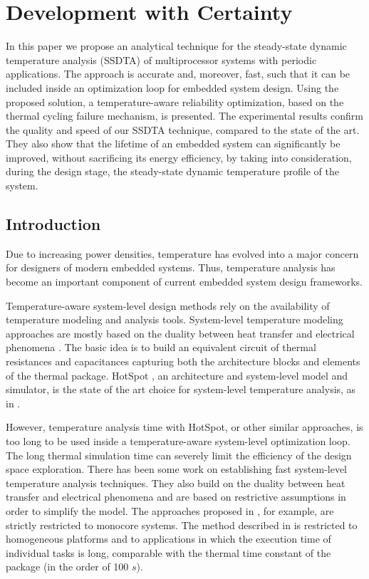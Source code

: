 \chapter{Development with Certainty}

In this paper we propose an analytical technique for the steady-state dynamic
temperature analysis (SSDTA) of multiprocessor systems with periodic
applications. The approach is accurate and, moreover, fast, such that it can be
included inside an optimization loop for embedded system design. Using the
proposed solution, a temperature-aware reliability optimization, based on the
thermal cycling failure mechanism, is presented. The experimental results
confirm the quality and speed of our SSDTA technique, compared to the state of
the art. They also show that the lifetime of an embedded system can
significantly be improved, without sacrificing its energy efficiency, by taking
into consideration, during the design stage, the steady-state dynamic
temperature profile of the system.

\section{Introduction}

Due to increasing power densities, temperature has evolved into a major concern
for designers of modern embedded systems. Thus, temperature analysis has become
an important component of current embedded system design frameworks.

Temperature-aware system-level design methods rely on the availability of
temperature modeling and analysis tools. System-level temperature modeling
approaches are mostly based on the duality between heat transfer and electrical
phenomena \cite{kreith2000}. The basic idea is to build an equivalent circuit of
thermal resistances and capacitances capturing both the architecture blocks and
elements of the thermal package. HotSpot \cite{skadron2003}, an architecture and
system-level model and simulator, is the state of the art choice for
system-level temperature analysis, as in \cite{srinivasan2004, liao2005,
coskun2006, liu2007, huang2009, xiang2010, thiele2011}.

However, temperature analysis time with HotSpot, or other similar approaches, is
too long to be used inside a temperature-aware system-level optimization loop.
The long thermal simulation time can severely limit the efficiency of the design
space exploration. There has been some work on establishing fast system-level
temperature analysis techniques. They also build on the duality between heat
transfer and electrical phenomena and are based on restrictive assumptions in
order to simplify the model. The approaches proposed in \cite{rai2011, bao2010},
for example, are strictly restricted to monocore systems. The method described
in \cite{rao2009} is restricted to homogeneous platforms and to applications in
which the execution time of individual tasks is long, comparable with the
thermal time constant of the package (in the order of 100 $s$).


